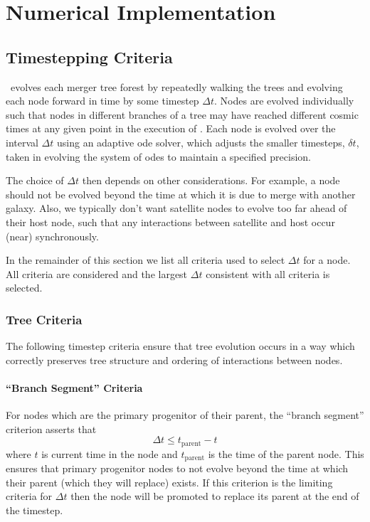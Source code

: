 \chapter{Numerical Implementation}

\section{Timestepping Criteria}\label{sec:TimesteppingCriteria}

\glc\ evolves each merger tree forest by repeatedly walking the trees and evolving each node forward in time by some timestep $\Delta t$. Nodes are evolved individually such that nodes in different branches of a tree may have reached different cosmic times at any given point in the execution of \glc. Each node is evolved over the interval $\Delta t$ using an adaptive \gls{ode} solver, which adjusts the smaller timesteps, $\delta t$, taken in evolving the system of \glspl{ode} to maintain a specified precision.

The choice of $\Delta t$ then depends on other considerations. For example, a node should not be evolved beyond the time at which it is due to merge with another galaxy. Also, we typically don't want satellite nodes to evolve too far ahead of their host node, such that any interactions between satellite and host occur (near) synchronously.

In the remainder of this section we list all criteria used to select $\Delta t$ for a node. All criteria are considered and the largest $\Delta t$ consistent with all criteria is selected.

\subsection{Tree Criteria}

The following timestep criteria ensure that tree evolution occurs in a way which correctly preserves tree structure and ordering of interactions between \glspl{node}.

\subsubsection{``Branch Segment'' Criteria}

For \glspl{node} which are the \gls{primary progenitor} of their \gls{parent}, the ``branch segment'' criterion asserts that
\begin{equation}
 \Delta t \le t_\mathrm{parent} - t
\end{equation}
where $t$ is current time in the \gls{node} and $t_\mathrm{parent}$ is the time of the \gls{parent} \gls{node}. This ensures that \gls{primary progenitor} \glspl{node} to not evolve beyond the time at which their \gls{parent} (which they will replace) exists.  If this criterion is the limiting criteria for $\Delta t$ then the \gls{node} will be promoted to replace its \gls{parent} at the end of the timestep. 

